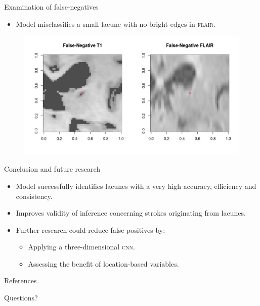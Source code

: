 \documentclass{beamer}
\begin{document}
\begin{frame}{Examination of false-negatives}
\begin{itemize}
\item Model misclassifies a small lacune with no bright edges in \textsc{flair}.
\end{itemize}
\begin{figure}
\centering
\includegraphics[width=\linewidth]{../Thesis_Docs/Images/7_FN_t1_flair.png}
\end{figure}
\end{frame}


\begin{frame}{Conclusion and future research}
\begin{itemize}
\item Model successfully identifies lacunes with a very high accuracy, efficiency and consistency.
\item Improves validity of inference concerning strokes originating from lacunes.
\item Further research could reduce false-positives by:
\begin{itemize}
\item Applying a three-dimensional \textsc{cnn}.
\item Assessing the benefit of location-based variables.
\end{itemize}
\end{itemize}

\end{frame}


\begin{frame}[allowframebreaks]{References}
	
	
\end{frame}

\begin{frame}
\begin{center}
\Huge{Questions?}
\end{center}
\end{frame}
\end{document}
